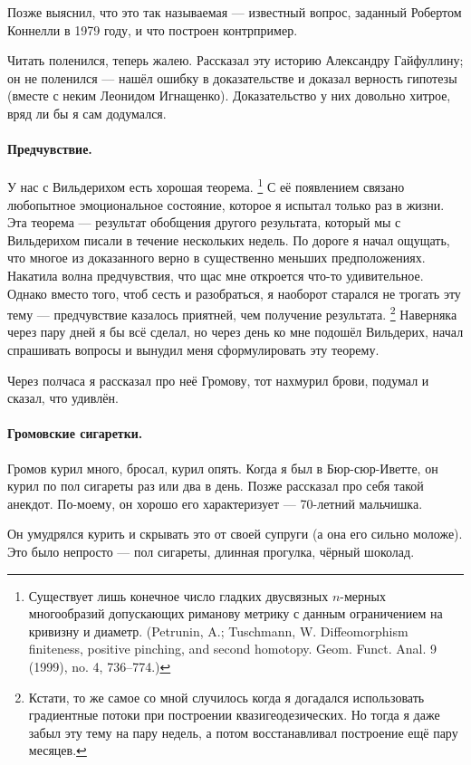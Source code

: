 \documentclass{book}
\begin{document}
Позже выяснил, что это так называемая  --- известный вопрос, заданный Робертом Коннелли в 1979 году, и что построен контрпример.

Читать поленился, теперь жалею.
Рассказал эту историю Александру Гайфуллину; он не поленился --- нашёл ошибку в доказательстве и доказал верность гипотезы (вместе с неким Леонидом Игнащенко).
Доказательство у них довольно хитрое, вряд ли бы я сам додумался.

\paragraph{Предчувствие.}
У нас с Вильдерихом есть хорошая теорема.%
\footnote{Существует лишь конечное число гладких двусвязных $n$-мерных многообразий допускающих риманову метрику с данным ограничением на кривизну и диаметр. (Petrunin, A.; Tuschmann, W. Diffeomorphism finiteness, positive pinching, and second homotopy. Geom. Funct. Anal. 9 (1999), no. 4, 736--774.)}
С её появлением связано любопытное эмоциональное состояние, которое я испытал только раз в жизни.
Эта теорема --- результат обобщения другого результата, который мы с Вильдерихом писали в течение нескольких недель.
По дороге я начал ощущать, что многое из доказанного верно в существенно меньших предположениях.
Накатила волна предчувствия, что щас мне откроется что-то удивительное.
Однако вместо того, чтоб сесть и разобраться, я наоборот старался не трогать эту тему --- предчувствие казалось приятней, чем получение результата.%
\footnote{Кстати, то же самое со мной случилось когда я догадался использовать градиентные потоки при построении квазигеодезических. Но тогда я даже забыл эту тему на пару недель, а потом восстанавливал построение ещё пару месяцев.}
Наверняка через пару дней я бы всё сделал, но через день ко мне подошёл Вильдерих, начал спрашивать вопросы и вынудил меня сформулировать эту теорему.

Через полчаса я рассказал про неё Громову, тот нахмурил брови, подумал и сказал, что удивлён.

\paragraph{Громовские сигаретки.}
Громов курил много, бросал, курил опять.
Когда я был в Бюр-сюр-Иветте, он курил по пол сигареты раз или два в день.
Позже рассказал про себя такой анекдот.
По-моему, он хорошо его характеризует --- 70-летний мальчишка.

Он умудрялся курить и скрывать это от своей супруги (а она его сильно моложе).
Это было непросто --- пол сигареты, длинная прогулка, чёрный шоколад.
\end{document}
